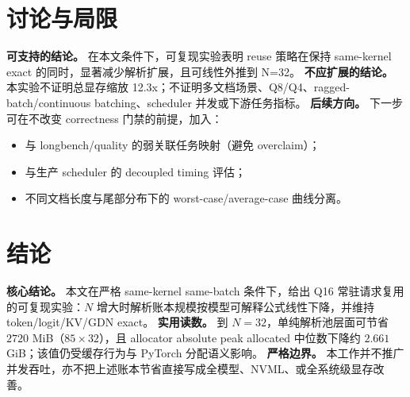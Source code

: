 \documentclass[11pt]{article}
\begin{document}
\section{讨论与局限}
\textbf{可支持的结论。} 在本文条件下，可复现实验表明 reuse 策略在保持 same-kernel exact 的同时，显著减少解析扩展，且可线性外推到 N=32。  
\textbf{不应扩展的结论。} 本实验不证明总显存缩放 12.3x；不证明多文档场景、Q8/Q4、ragged-batch/continuous batching、scheduler 并发或下游任务指标。  
\textbf{后续方向。} 下一步可在不改变 correctness 门禁的前提，加入：
\begin{itemize}
  \item 与 longbench/quality 的弱关联任务映射（避免 overclaim）；
  \item 与生产 scheduler 的 decoupled timing 评估；
  \item 不同文档长度与尾部分布下的 worst-case/average-case 曲线分离。  
\end{itemize}

\section{结论}
\textbf{核心结论。} 本文在严格 same-kernel same-batch 条件下，给出 Q16 常驻请求复用的可复现实验：$N$ 增大时解析账本规模按模型可解释公式线性下降，并维持 token/logit/KV/GDN exact。  
\textbf{实用读数。} 到 $N=32$，单纯解析池层面可节省 $2720$ MiB（$85\times32$），且 allocator absolute peak allocated 中位数下降约 $2.661$ GiB；该值仍受缓存行为与 PyTorch 分配语义影响。  
\textbf{严格边界。} 本工作并不推广并发吞吐，亦不把上述账本节省直接写成全模型、NVML、或全系统级显存改善。
\end{document}
